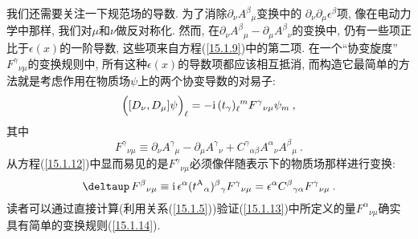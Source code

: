 我们还需要关注一下规范场的导数. 为了消除$\partial _{\nu }{A^{\beta }}_{\mu }$变换中的
$\partial_{\nu}\partial _{\mu }\epsilon ^{\beta }$项, 像在电动力学中那样, 
我们对$\mu $和$\nu$做反对称化. 然而, 在$\partial _{\nu }{A^{\beta }}_{\mu }-\partial _{\mu }{A^{\beta }}_{\nu }$的变换中, 
仍有一些项正比于$\epsilon (x)$的一阶导数, 这些项来自方程(\ref{15.1.9})中的第二项. 在一个``协变旋度'' ${F^{\gamma }}_{\nu\mu}$的变换规则中, 所有这种$\epsilon (x)$的导数项都应该相互抵消, 而构造它最简单的方法就是考虑作用在物质场$\psi $上的两个协变导数的对易子:%
\begin{equation}
\Big( [ D_{\nu },D_{\mu }]\psi \Big) _{\ell }=-\mathrm{i}\,(t_{\gamma })_{\ell
}^{\phantom{\ell}m}{F^{\gamma }}_{\nu\mu}\psi _{m}\:, 
\label{15.1.12}
\end{equation}%
其中\begin{equation}
{F^{\gamma }}_{\nu\mu}\equiv \partial _{\nu }{A^{\gamma }}_{\mu }-\partial _{\mu }{A^{\gamma }}_{\nu }+{C^{\gamma }}_{\alpha \beta }{A^{\alpha}}_{\nu }{A^{\beta }}_{\mu }\:.   \label{15.1.13}
\end{equation}%
从方程(\ref{15.1.12})中显而易见的是${F^{\gamma }}_{\nu \mu}$必须像伴随表示下的物质场那样进行变换:%
\begin{equation}
\deltaup\, {F^{\beta }}_{\nu \mu }\equiv \mi\,\epsilon ^{\alpha }({t^{\text{A}}}_{%
\alpha })^{\beta }{}_{\gamma }F^{\gamma}{}_{\nu \mu }
=\epsilon ^{\alpha }{C^{\beta }}_{\gamma \alpha }{F^{\gamma }}_{\nu \mu }\:.
\label{15.1.14}
\end{equation}%
读者可以通过直接计算(利用关系(\ref{15.1.5}))验证(\ref{15.1.13})中所定义的量${F^{\alpha }}_{\nu \mu }$确实具有简单的变换规则(\ref{15.1.14}).

